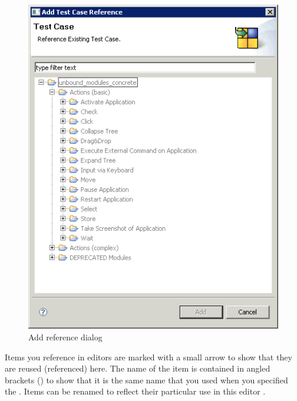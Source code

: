 \begin{enumerate}
\begin{enumerate}
\begin{figure}[h]
\begin{center}
\includegraphics{Tasks/Editors/PS/referencetestcasedialog}
\caption{Add \gdcase{} reference dialog}
\label{referencetestcasedialog}
\end{center}
\end{figure} 

\end{enumerate}
\end{enumerate}

Items you reference in editors are marked with a small arrow to show that they are reused (referenced) here. The name of the item is contained in angled brackets (\bxshell{< >}) to show that it is the same name that you used when you specified the \gdcase{}. Items can be renamed to reflect their particular use in this editor .


